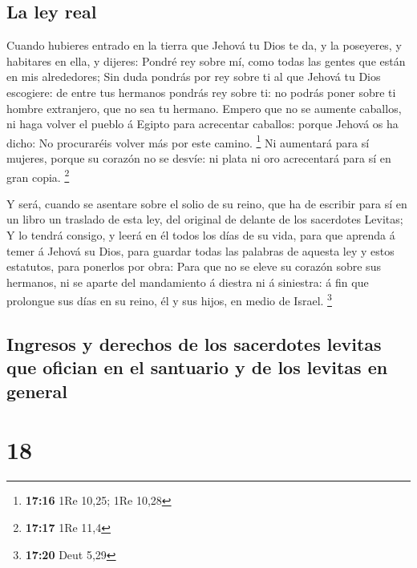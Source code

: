 \hypertarget{la-ley-real}{%
\subsection{La ley real}\label{la-ley-real}}

 Cuando hubieres entrado en la tierra que Jehová tu Dios
te da, y la poseyeres, y habitares en ella, y dijeres: Pondré rey sobre
mí, como todas las gentes que están en mis alrededores; 
Sin duda pondrás por rey sobre ti al que Jehová tu Dios escogiere: de
entre tus hermanos pondrás rey sobre ti: no podrás poner sobre ti hombre
extranjero, que no sea tu hermano.  Empero que no se
aumente caballos, ni haga volver el pueblo á Egipto para acrecentar
caballos: porque Jehová os ha dicho: No procuraréis volver más por este
camino. \footnote{\textbf{17:16} 1Re 10,25; 1Re 10,28} 
Ni aumentará para sí mujeres, porque su corazón no se desvíe: ni plata
ni oro acrecentará para sí en gran copia. \footnote{\textbf{17:17} 1Re
  11,4}

 Y será, cuando se asentare sobre el solio de su reino,
que ha de escribir para sí en un libro un traslado de esta ley, del
original de delante de los sacerdotes Levitas;  Y lo
tendrá consigo, y leerá en él todos los días de su vida, para que
aprenda á temer á Jehová su Dios, para guardar todas las palabras de
aquesta ley y estos estatutos, para ponerlos por obra: 
Para que no se eleve su corazón sobre sus hermanos, ni se aparte del
mandamiento á diestra ni á siniestra: á fin que prolongue sus días en su
reino, él y sus hijos, en medio de Israel. \footnote{\textbf{17:20} Deut
  5,29}

\hypertarget{ingresos-y-derechos-de-los-sacerdotes-levitas-que-ofician-en-el-santuario-y-de-los-levitas-en-general}{%
\subsection{Ingresos y derechos de los sacerdotes levitas que ofician en
el santuario y de los levitas en
general}\label{ingresos-y-derechos-de-los-sacerdotes-levitas-que-ofician-en-el-santuario-y-de-los-levitas-en-general}}

\hypertarget{section-17}{%
\section{18}\label{section-17}}

